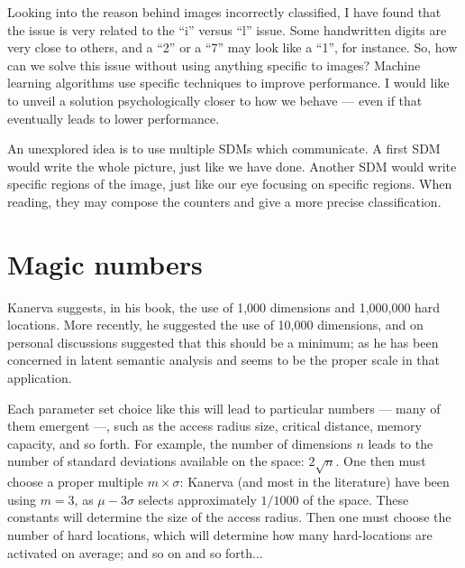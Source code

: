 Looking into the reason behind images incorrectly classified, I have found that the issue is very related to the ``i'' versus ``l'' issue. Some handwritten digits are very close to others, and a ``2'' or a ``7'' may look like a ``1'', for instance. So, how can we solve this issue without using anything specific to images?  Machine learning algorithms use specific techniques to improve performance. I would like to unveil a solution psychologically closer to how we behave --- even if that eventually leads to lower performance.

An unexplored idea is to use multiple SDMs which communicate. A first SDM would write the whole picture, just like we have done. Another SDM would write specific regions of the image, just like our eye focusing on specific regions. When reading, they may compose the counters and give a more precise classification.







\section{Magic numbers}

Kanerva suggests, in his book, the use of 1,000 dimensions and 1,000,000 hard locations.  More recently, he suggested the use of 10,000 dimensions, and on personal discussions suggested that this should be a minimum; as he has been concerned in latent semantic analysis and seems to be the proper scale in that application.

Each parameter set choice like this will lead to particular numbers --- many of them emergent ---, such as the access radius size, critical distance, memory capacity, and so forth.  For example, the number of dimensions $n$ leads to the number of standard deviations available on the space: $2 \sqrt{n}$.  One then must choose a proper multiple $m\times\sigma$: Kanerva (and most in the literature) have been using $m=3$, as $\mu-3\sigma$ selects approximately $1/1000$ of the space. These constants will determine the size of the access radius.  Then one must choose the number of hard locations, which will determine how many hard-locations are activated on average; and so on and so forth...


